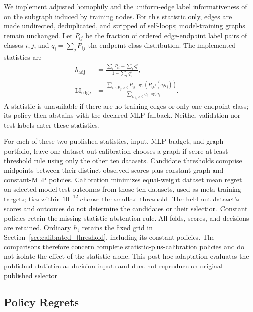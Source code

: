 We implement adjusted homophily and the uniform-edge label informativeness of \citet{platonov2023characterizing} on the subgraph induced by training nodes. For this statistic only, edges are made undirected, deduplicated, and stripped of self-loops; model-training graphs remain unchanged. Let $P_{ij}$ be the fraction of ordered edge-endpoint label pairs of classes $i,j$, and $q_i=\sum_jP_{ij}$ the endpoint class distribution. The implemented statistics are
\begin{align}
h_{\mathrm{adj}}&=\frac{\sum_iP_{ii}-\sum_iq_i^2}{1-\sum_iq_i^2},\\
\mathrm{LI}_{\mathrm{edge}}&=\frac{\sum_{i,j:P_{ij}>0}P_{ij}\log(P_{ij}/(q_iq_j))}
{-\sum_{i:q_i>0}q_i\log q_i}.
\end{align}
A statistic is unavailable if there are no training edges or only one endpoint class; its policy then abstains with the declared MLP fallback. Neither validation nor test labels enter these statistics.

For each of these two published statistics, input, MLP budget, and graph portfolio, leave-one-dataset-out calibration chooses a graph-if-score-at-least-threshold rule using only the other ten datasets. Candidate thresholds comprise midpoints between their distinct observed scores plus constant-graph and constant-MLP policies. Calibration minimizes equal-weight dataset mean regret on selected-model test outcomes from those ten datasets, used as meta-training targets; ties within $10^{-12}$ choose the smallest threshold. The held-out dataset's scores and outcomes do not determine the candidates or their selection. Constant policies retain the missing-statistic abstention rule. All folds, scores, and decisions are retained. Ordinary $h_1$ retains the fixed grid in Section~\ref{sec:calibrated_threshold}, including its constant policies. The comparisons therefore concern complete statistic-plus-calibration policies and do not isolate the effect of the statistic alone. This post-hoc adaptation evaluates the published statistics as decision inputs and does not reproduce an original published selector.

\subsection{Policy Regrets}

